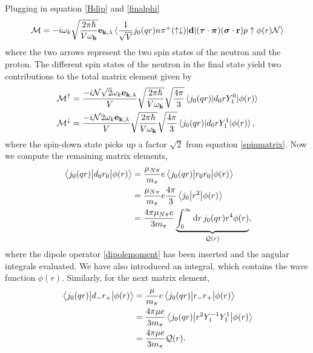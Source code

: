 Plugging in equation \eqref{Hdip} and \eqref{finalphi}
\begin{align}
	\mathcal{M} =-i\omega_k\sqrt{\frac{2\pi\hbar}{V\omega_{\bm{\mathrm{k}}}}}\bm{\mathrm{e}}_{\bm{\mathrm{k}},\lambda}\mel*{\frac{1}{\sqrt{V}} j_0(qr)n\pi^+ (\uparrow \downarrow)}{\bm{\mathrm{d}}}{(\bm{\mathrm{\tau}}\cdot \bm{\mathrm{\pi}})(\bm{\mathrm{\sigma}}\cdot \bm{\mathrm{r}})p\uparrow \phi(r)\mathcal{N}}
\end{align}
where the two arrows represent the two spin states of the neutron and the proton. The different spin states of the neutron in the final state yield two contributions to the total matrix element given by
\begin{align}
	\mathcal{M}^{\uparrow} %
	&= \frac{-i\mathcal{N}\sqrt{2}\omega_k\vec{e}_{\vec{k},\lambda}}{V}\sqrt{\frac{2\pi\hbar}{V\omega_{\vec{k}}}}\sqrt{\frac{4\pi}{3}}\mel*{j_0(qr)}{d_0 r Y_1^0}{\phi(r)} \\
	\mathcal{M}^{\downarrow}  %
	&=\frac{-i\mathcal{N}2\omega_k\vec{e}_{\vec{k},\lambda}}{V}\sqrt{\frac{2\pi\hbar}{V\omega_{\vec{k}}}}\sqrt{\frac{4\pi}{3}}\mel*{j_0(qr)}{d_0 r Y_1^1}{\phi(r)}, 
\end{align}
where the spin-down state picks up a factor $\sqrt{2}$ from equation \eqref{spinmatrix}. Now we compute the remaining matrix elements,
\begin{align}
	\mel{j_0(qr)}{d_0 r_0}{\phi(r)} &= \frac{\mu_{N\pi}}{m_\pi}e \mel{j_0(qr)}{r_0r_0}{\phi(r)} \\
	&= \frac{\mu_{N\pi}}{m_\pi}e\frac{4\pi}{3} \mel{j_0}{r^2}{\phi(r)} \\
	&= \frac{4\pi \mu_{N\pi} e}{3m_\pi} \underbrace{\int_0^\infty \text{d}r \, j_0(qr)r^4\phi(r)}_{\mathcal{Q}(r)}, \label{Matrix1}
\end{align}
where the dipole operator \eqref{dipolemoment} has been inserted and the angular integrals evaluated. We have also introduced an integral, which contains the wave function $\phi(r)$. Similarly, for the next matrix element,
\begin{align}
	\mel{j_0(qr)}{d_{-}r_{+}}{\phi(r)} &= \frac{\mu}{m_\pi}e \mel{j_0(qr)}{r_{-}r_{+}}{\phi(r)} \\
	&= \frac{4\pi \mu e}{3 m_\pi} \mel{j_0(qr)}{r^2 Y_1^{-1}Y_1^1}{\phi(r)} \\
	&= \frac{4\pi \mu e}{3 m_\pi} \mathcal{Q}(r). \label{Matrix2}
\end{align}
